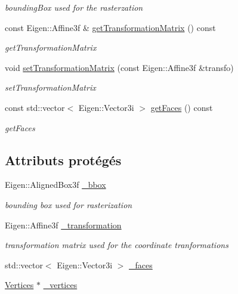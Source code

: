 \begin{DoxyCompactItemize}
\begin{DoxyCompactList}\small\item\em bounding\+Box used for the rasterzation \end{DoxyCompactList}\item 
const Eigen\+::\+Affine3f \& \hyperlink{class_shape_a9a1f2d5c370b8c9194fc51ea37a03cac}{get\+Transformation\+Matrix} () const
\begin{DoxyCompactList}\small\item\em get\+Transformation\+Matrix \end{DoxyCompactList}\item 
void \hyperlink{class_shape_a04294d1d80623bb8c5a7d4037549fa27}{set\+Transformation\+Matrix} (const Eigen\+::\+Affine3f \&transfo)
\begin{DoxyCompactList}\small\item\em set\+Transformation\+Matrix \end{DoxyCompactList}\item 
const std\+::vector$<$ Eigen\+::\+Vector3i $>$ \hyperlink{class_shape_aeeb67de72adb9667c1eb48129f3e5ffb}{get\+Faces} () const
\begin{DoxyCompactList}\small\item\em get\+Faces \end{DoxyCompactList}\end{DoxyCompactItemize}
\subsection*{Attributs protégés}
\begin{DoxyCompactItemize}
\item 
Eigen\+::\+Aligned\+Box3f \hyperlink{class_shape_aa2399d2b2884c25ebc2e8f87584cc529}{\+\_\+bbox}
\begin{DoxyCompactList}\small\item\em bounding box used for rasterization \end{DoxyCompactList}\item 
Eigen\+::\+Affine3f \hyperlink{class_shape_a67c0ffb0290a2a1ff5e602c324130332}{\+\_\+transformation}
\begin{DoxyCompactList}\small\item\em transformation matrix used for the coordinate tranformations \end{DoxyCompactList}\item 
std\+::vector$<$ Eigen\+::\+Vector3i $>$ \hyperlink{class_shape_abb07b26e344946f745964c019a2c598e}{\+\_\+faces}
\item 
\hyperlink{struct_shape_1_1_vertices}{Vertices} $\ast$ \hyperlink{class_shape_ac2f7f1148a34325d99be6d983fcf9bb0}{\+\_\+vertices}
\end{DoxyCompactItemize}


